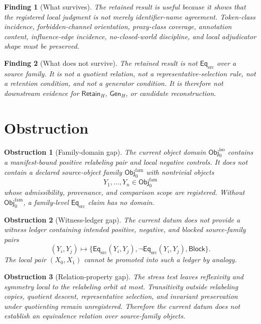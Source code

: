 \documentclass[11pt]{article}
\newcommand{\Obj}{\mathsf{Obj}_{0}^{\mathrm{iso}}}
\newcommand{\ObjFam}{\mathsf{Obj}_{0}^{\mathrm{fam}}}
\newcommand{\EqSrc}{\mathsf{Eq}_{\mathrm{src}}}
\newcommand{\GenH}{\mathsf{Gen}_{H}}
\newcommand{\RetainH}{\mathsf{Retain}_{H}}
\newcommand{\Block}{\mathsf{Block}}
\newtheorem{obstruction}{Obstruction}
\newtheorem{finding}{Finding}
\begin{document}
\begin{finding}[What survives]
The retained result is useful because it shows that the registered local
judgment is not merely identifier-name agreement. Token-class incidence,
forbidden-channel orientation, proxy-class coverage, annotation content,
influence-edge incidence, no-closed-world discipline, and local adjudicator
shape must be preserved.
\end{finding}

\begin{finding}[What does not survive]
The retained result is not \(\EqSrc\) over a source family. It is not a
quotient relation, not a representative-selection rule, not a retention
condition, and not a generator condition. It is therefore not downstream
evidence for \(\RetainH\), \(\GenH\), or candidate reconstruction.
\end{finding}

\section{Obstruction}

\begin{obstruction}[Family-domain gap]
The current object domain \(\Obj\) contains a manifest-bound positive
relabeling pair and local negative controls. It does not contain a
declared source-object family \(\ObjFam\) with nontrivial objects
\[
    Y_{1},\dots,Y_{n}\in\ObjFam
\]
whose admissibility, provenance, and comparison scope are registered.
Without \(\ObjFam\), a family-level \(\EqSrc\) claim has no domain.
\end{obstruction}

\begin{obstruction}[Witness-ledger gap]
The current datum does not provide a witness ledger containing intended
positive, negative, and blocked source-family pairs
\[
    (Y_{i},Y_{j})\mapsto
    \{\EqSrc(Y_{i},Y_{j}),\neg\EqSrc(Y_{i},Y_{j}),\Block\}.
\]
The local pair \((X_{0},X_{1})\) cannot be promoted into such a ledger by
analogy.
\end{obstruction}

\begin{obstruction}[Relation-property gap]
The stress test leaves reflexivity and symmetry local to the relabeling
orbit at most. Transitivity outside relabeling copies, quotient descent,
representative selection, and invariant preservation under quotienting
remain unregistered. Therefore the current datum does not establish an
equivalence relation over source-family objects.
\end{obstruction}
\end{document}
